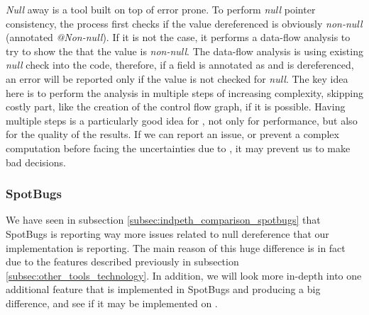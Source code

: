 \emph{Null} away is a tool built on top of error prone. 
To perform \emph{null} pointer consistency, the process first checks if the value dereferenced is obviously \emph{non-null} (annotated \emph{@Non-null}). 
If it is not the case, it performs a data-flow analysis to try to show the that the value is \emph{non-null}. 
The data-flow analysis is using existing \emph{null} check into the code, therefore, if a field is annotated as \nullable{} and is dereferenced, an error will be reported only if the value is not checked for \emph{null}. \newline
The key idea here is to perform the analysis in multiple steps of increasing complexity, skipping costly part, like the creation of the control flow graph, if it is possible.
Having multiple steps is a particularly good idea for \slang{}, not only for performance, but also for the quality of the results. 
If we can report an issue, or prevent a complex computation before facing the uncertainties due to \slang{}, it may prevent us to make bad decisions.

\subsubsection{SpotBugs}
\label{subsec:spotbugs_specific}

We have seen in subsection \ref{subsec:indpeth_comparison_spotbugs} that SpotBugs is reporting way more issues related to null dereference that our implementation is reporting.
The main reason of this huge difference is in fact due to the features described previously in subsection \ref{subsec:other_tools_technology}.
In addition, we will look more in-depth into one additional feature that is implemented in SpotBugs and producing a big difference, and see if it may be implemented on \slang{}.

